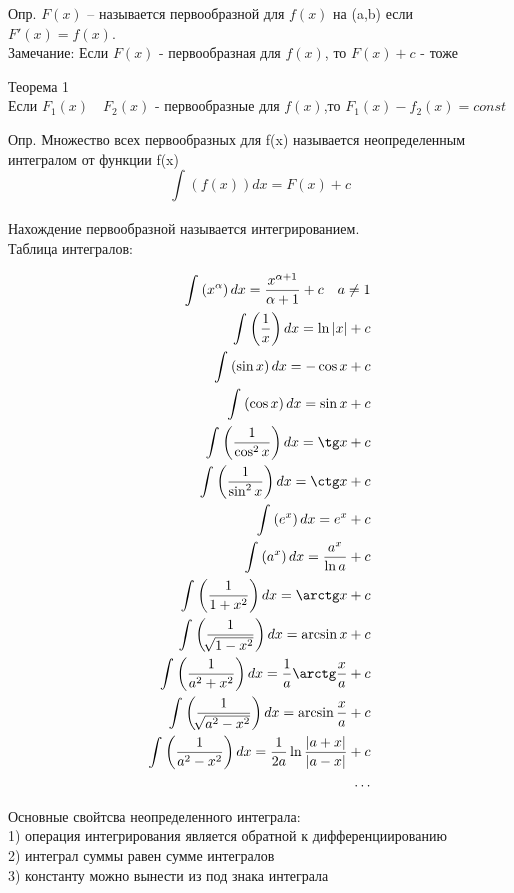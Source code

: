 \documentclass[a4paper, 12pt]{article}
\begin{document}
Опр. $ F(x) $ -- называется первообразной для $ f(x) $ на (a,b) если $ F'(x) = f(x) $.\\
Замечание: Если $ F(x) $ - первообразная для $ f(x) $, то $ F(x) + c  $ - тоже\\      
 \begin{mdframed}[backgroundcolor=blue!20] 
        Теорема 1\\
        Если $ F_1(x) \quad F_2(x) $ - первообразные для $ f(x) $,то $ F_1(x)-f_2(x) = const $   
     \end{mdframed}

Опр. Множество всех первообразных для f(x) называется неопределенным интегралом от функции f(x)
\[
  \int_{}^{}\left(f(x)\right)dx = F(x) +c
\]

Нахождение первообразной называется интегрированием.\\

Таблица интегралов:

\begin{align}
  \int_{}^{}\left(x^\alpha\right) dx = \frac{x^{\alpha +1}}{\alpha +1} + c \quad a \neq 1\\ 
  \int_{}^{}\left(\frac{1}{x}\right)dx = \ln |x| +c\\
  \int_{}^{}\left(\sin x\right)dx = - \cos x +c\\
  \int_{}^{}\left(\cos x\right)dx = \sin x + c \\
  \int_{}^{}\left(\frac{1}{\cos^2 x}\right)dx = \tg x +c \\
  \int_{}^{}\left(\frac{1}{\sin^2 x}\right)dx = \ctg x + c\\
  \int_{}^{}\left(e^x\right)dx = e^x + c\\
  \int_{}^{}\left(a^x\right)dx = \frac{a^x}{\ln a} + c\\
  \int_{}^{}\left(\frac{1}{1+x^2}\right)dx = \arctg x + c \\
  \int_{}^{}\left(\frac{1}{\sqrt[]{1-x^2}}\right)dx = \arcsin x + c \\
  \int_{}^{}\left(\frac{1}{a^2 + x^2}\right)dx = \frac{1}{a}\arctg \frac{x}{a} + c\\
  \int_{}^{}\left(\frac{1}{\sqrt[]{a^2 - x^2}}\right)dx = \arcsin \frac{x}{a} + c\\
  \int_{}^{}\left(\frac{1}{a^2 - x^2}\right)dx = \frac{1}{2a}\ln \frac{|a+x|}{|a-x|} +c\\
  \ldots
\end{align}




Основные свойтсва неопределенного интеграла:\\
1) операция интегрирования является обратной к дифференциированию\\
2) интеграл суммы равен сумме интегралов\\
3) константу можно вынести из под знака интеграла\\
\end{document}
